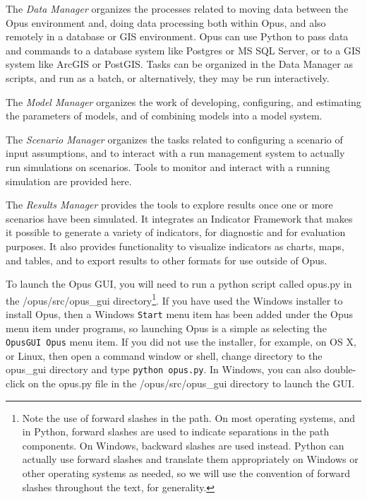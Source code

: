\squishlist
\item The \emph{Data Manager} organizes the processes related to moving data between the Opus environment and, doing data processing both within Opus, and also remotely in a database or GIS environment.  Opus can use Python to pass data and commands to a database system like Postgres or MS SQL Server, or to a GIS system like ArcGIS or PostGIS.  Tasks can be organized in the Data Manager as scripts, and run as a batch, or alternatively, they may be run interactively.
\item The \emph{Model Manager} organizes the work of developing, configuring, and estimating the parameters of models, and of combining models into a model system.
\item The \emph{Scenario Manager} organizes the tasks related to configuring a scenario of input assumptions, and to interact with a run management system to actually run simulations on scenarios.  Tools to monitor and interact with a running simulation are provided here.
\item The \emph{Results Manager} provides the tools to explore results once one or more scenarios have been simulated.  It integrates an Indicator Framework that makes it possible to generate a variety of indicators, for diagnostic and for evaluation purposes.  It also provides functionality to visualize indicators as charts, maps, and tables, and to export results to other formats for use outside of Opus.
\squishend

To launch the Opus GUI, you will need to run a python script
called opus.py in the /opus/src/opus\_gui directory\footnote{Note the
use of forward slashes in the path.  On most operating systems, and in
Python, forward slashes are used to indicate separations in the path
components.  On Windows, backward slashes are used instead.  Python can
actually use forward slashes and translate them appropriately on
Windows or other operating systems as needed, so we will use the
convention of forward slashes throughout the text, for generality.}. 
If you have used the Windows installer to install Opus, then a Windows
\texttt{Start} menu item has been added under the Opus menu item
under programs, so launching Opus is a simple as selecting the
\texttt{OpusGUI Opus} menu item.  If you did not use the installer,
for example, on OS X, or Linux, then open a command window or shell, change directory to
the opus\_gui directory and type \texttt{python opus.py}.  In Windows,
you can also double-click on the opus.py file in the
/opus/src/opus\_gui directory to launch the GUI.\\

